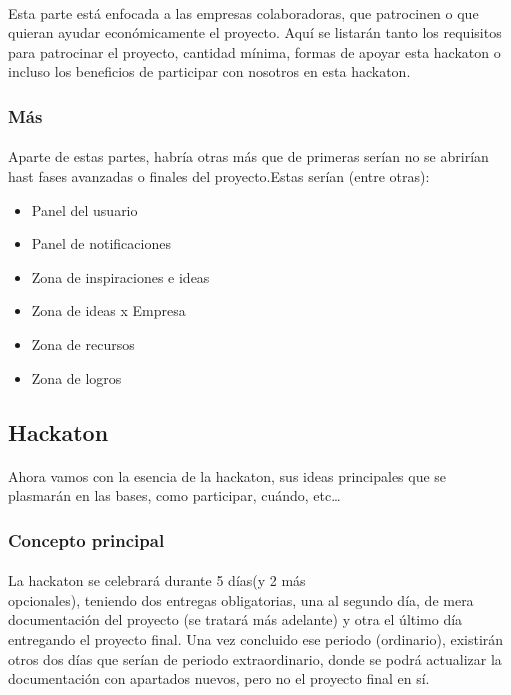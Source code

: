 \documentclass[a4paper]{article}
\begin{document}
    \paragraph{}
    Esta parte está enfocada a las empresas colaboradoras, que patrocinen o que quieran
    ayudar económicamente el proyecto. Aquí se listarán tanto los requisitos para patrocinar 
    el proyecto, cantidad mínima, formas de apoyar esta hackaton o incluso los beneficios de 
    participar con nosotros en esta hackaton.
    \subsubsection[más]{Más}
    \paragraph{}
    Aparte de estas partes, habría otras más que de primeras serían no se abrirían
    hast fases avanzadas o finales del proyecto.Estas serían (entre otras): 
    \begin{itemize}
        \item Panel del usuario
        \item Panel de notificaciones
        \item Zona de inspiraciones e ideas
        \item Zona de ideas x Empresa
        \item Zona de recursos
        \item Zona de logros
    \end{itemize}

    \subsection[Hackaton]{Hackaton}
    \paragraph{}
    Ahora vamos con la esencia de la hackaton, sus ideas principales
    que se plasmarán en las bases, como participar, cuándo, etc\dots
    \subsubsection[Concepto]{Concepto principal}
    \paragraph{}
    La hackaton se celebrará durante 5 días(y 2 más\\ opcionales), 
    teniendo dos entregas obligatorias, una al segundo día, de mera 
    documentación del proyecto (se tratará más adelante) y otra el 
    último día entregando el proyecto final. Una vez concluido ese 
    periodo (ordinario), existirán otros dos días que serían de 
    periodo extraordinario, donde se podrá actualizar la documentación 
    con apartados nuevos, pero no el proyecto final en sí.
\end{document}
